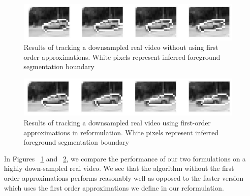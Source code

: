 \begin{figure}[h]
\begin{center}
	\includegraphics[scale=0.35]{figures/car_tracking.jpg}
	\caption{Results of tracking a downsampled real video without using first order approximations. White pixels represent inferred foreground segmentation boundary}
	\label{fig:trackCar}
\end{center}
\end{figure}

\begin{figure}[h]
\begin{center}
	\includegraphics[scale=0.35]{figures/horn_schunk_car_tracking.jpg}
	\caption{Results of tracking a downsampled real video using first-order approximations in reformulation. White pixels represent inferred foreground segmentation boundary}
	\label{fig:HStrackCar}
\end{center}
\end{figure}

In Figures ~\ref{fig:trackCar} and ~\ref{fig:HStrackCar}, we compare the performance of our two formulations on a highly down-sampled real video. We see that the algorithm without the first order approximations performs reasonably well as opposed to the faster version which uses the first order approximations we define in our reformulation.